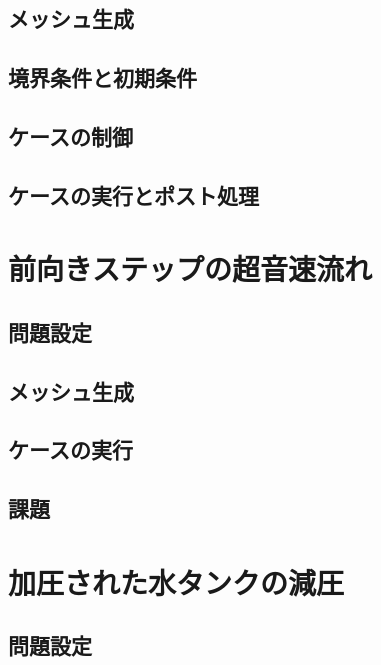 \subsection{メッシュ生成}
\label{ssec:3.2.2}

\subsection{境界条件と初期条件}
\label{ssec:3.2.3}

\subsection{ケースの制御}
\label{ssec:3.2.4}

\subsection{ケースの実行とポスト処理}
\label{ssec:3.2.5}


\section{前向きステップの超音速流れ}
\label{sec:3.3}

\subsection{問題設定}
\label{ssec:3.3.1}

\subsection{メッシュ生成}
\label{ssec:3.3.2}

\subsection{ケースの実行}
\label{ssec:3.3.3}

\subsection{課題}
\label{ssec:3.3.4}


\section{加圧された水タンクの減圧}
\label{sec:3.4}

\subsection{問題設定}
\label{ssec:3.4.1}

